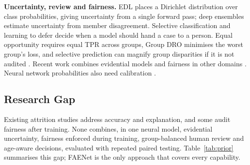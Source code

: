 \documentclass[conference]{IEEEtran}
\begin{document}
\textbf{Uncertainty, review and fairness.} EDL \cite{sensoy2018} places a Dirichlet distribution over class probabilities, giving uncertainty from a single forward pass; deep ensembles \cite{lakshminarayanan2017} estimate uncertainty from member disagreement. Selective classification \cite{geifman2017} and learning to defer \cite{madras2018} decide when a model should hand a case to a person. Equal opportunity \cite{hardt2016} requires equal TPR across groups, Group DRO \cite{sagawa2020} minimises the worst group's loss, and selective prediction can magnify group disparities if it is not audited \cite{jones2021}. Recent work combines evidential models and fairness in other domains \cite{barker2026,chen2026faml,chen2025ufare}. Neural network probabilities also need calibration \cite{guo2017,platt1999}.

\subsection{Research Gap}
Existing attrition studies address accuracy and explanation, and some audit fairness after training. None combines, in one neural model, evidential uncertainty, fairness enforced during training, group-balanced human review and age-aware decisions, evaluated with repeated paired testing. Table~\ref{tab:prior} summarises this gap; FAENet is the only approach that covers every capability.

\begin{table}[t]\centering
\caption{Capabilities of FAENet compared with prior attrition studies}\label{tab:prior}
\scriptsize\setlength{\tabcolsep}{2.5pt}
\end{table}
\end{document}
